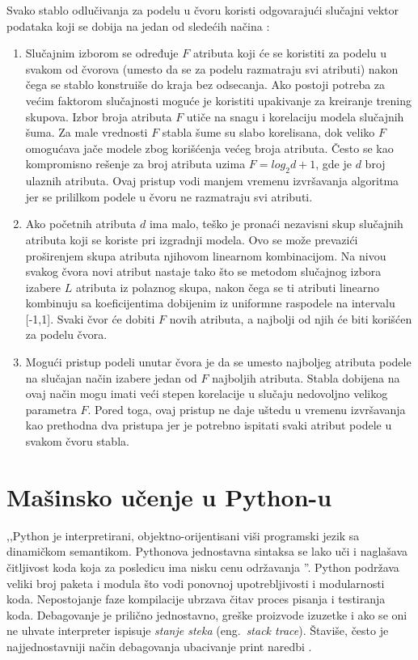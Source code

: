 \documentclass[12pt,oneside]{memoir}
\begin{document}
Svako stablo odlučivanja za podelu u čvoru koristi odgovarajući slučajni vektor podataka koji se dobija na jedan od sledećih načina \cite{mitic}:
\begin{enumerate}[1)]
\item Slučajnim izborom se određuje $F$ atributa koji će se koristiti za podelu u svakom od čvorova (umesto da se za podelu razmatraju svi atributi) nakon čega se stablo konstruiše do kraja bez odsecanja. Ako postoji potreba za većim faktorom slučajnosti moguće je koristiti upakivanje za kreiranje trening skupova. Izbor broja atributa $F$ utiče na snagu i korelaciju modela slučajnih šuma. Za male vrednosti $F$ stabla šume su slabo korelisana, dok veliko $F$ omogućava jače modele zbog korišćenja većeg broja atributa. Često se kao kompromisno rešenje za broj atributa uzima $F=log_2d+1$, gde je $d$ broj ulaznih atributa. Ovaj pristup vodi manjem vremenu izvršavanja algoritma jer se prililkom podele u čvoru ne razmatraju svi atributi. 
\item Ako početnih atributa $d$ ima malo, teško je pronaći nezavisni skup slučajnih atributa koji se koriste pri izgradnji modela. Ovo se može prevazići proširenjem skupa atributa njihovom linearnom kombinacijom. Na nivou svakog čvora novi atribut nastaje tako što se metodom slučajnog izbora izabere $L$ atributa iz polaznog skupa, nakon čega se ti atributi linearno kombinuju sa koeficijentima dobijenim iz uniformne raspodele na intervalu [-1,1]. Svaki čvor će dobiti $F$ novih atributa, a najbolji od njih će biti korišćen za podelu čvora. 
\item Mogući pristup podeli unutar čvora je da se umesto najboljeg atributa podele na slučajan način izabere jedan od $F$ najboljih atributa. Stabla dobijena na ovaj način mogu imati veći stepen korelacije u slučaju nedovoljno velikog parametra $F$. Pored toga, ovaj pristup ne daje uštedu u vremenu izvršavanja kao prethodna dva pristupa jer je potrebno ispitati svaki atribut podele u svakom čvoru stabla. 
\end{enumerate}

\section{Mašinsko učenje u Python-u}
,,Python je interpretirani, objektno-orijentisani viši programski jezik sa dinamičkom semantikom. Pythonova jednostavna sintaksa se lako uči i naglašava čitljivost koda koja za posledicu ima nisku cenu održavanja \cite{python-blurb}''. Python podržava veliki broj paketa i modula što vodi ponovnoj upotrebljivosti i modularnosti koda. Nepostojanje faze kompilacije ubrzava čitav proces pisanja i testiranja koda. Debagovanje je prilično jednostavno, greške proizvode izuzetke i ako se oni ne uhvate interpreter ispisuje \textit{stanje steka} (eng.~\textit{stack trace}). Štaviše, često je najjednostavniji način debagovanja ubacivanje print naredbi \cite{python-blurb}. %
\end{document}
